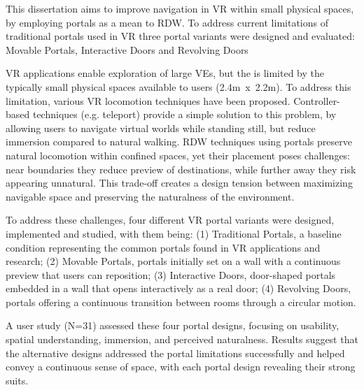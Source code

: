 

%

This dissertation aims to improve navigation in \gls{VR} within small physical spaces, by employing portals as a mean to \gls{RDW}. 
To address current limitations of traditional portals used in \gls{VR} three portal variants were designed and evaluated: 
Movable Portals, Interactive Doors and Revolving Doors 

\gls{VR} applications enable exploration of large \glspl{VE}, but the  is limited by the 
typically small physical spaces available to users (2.4m~x~2.2m).
To address this limitation, various \gls{VR} locomotion techniques have been proposed. Controller-based techniques (e.g. teleport) provide 
a simple solution to this problem, by allowing users to navigate virtual worlds while standing still, 
but reduce immersion compared to natural walking.
\gls{RDW} techniques using portals preserve natural locomotion within confined spaces, 
yet their placement poses challenges: near boundaries they reduce preview of destinations, while further away they risk appearing unnatural.
This trade-off creates a design tension between maximizing navigable space and preserving the naturalness of the environment.

To address these challenges,
four different \gls{VR} portal variants were designed, implemented and studied, with them being:
(1) Traditional Portals, a baseline condition representing the common portals found in \gls{VR} applications and research; 
(2) Movable Portals, portals initially set on a wall with a continuous preview that users can reposition; 
(3) Interactive Doors, door-shaped portals embedded in a wall that opens interactively as a real door;
(4) Revolving Doors, portals offering a continuous transition between rooms through a circular motion.

A user study (N=31) assessed these four portal designs, focusing on usability, spatial
understanding, immersion, and perceived naturalness. Results suggest that the alternative designs addressed the portal limitations 
successfully and helped convey a continuous sense of space, with each portal design revealing their strong suits.

